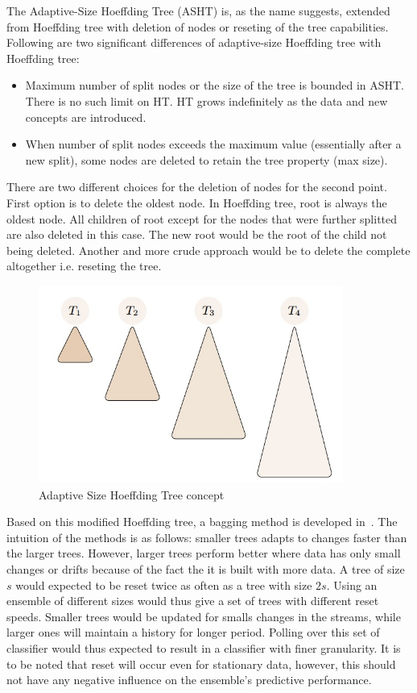 \documentclass[a4paper, 11pt, oneside]{book}
\begin{document}
The Adaptive-Size Hoeffding Tree (ASHT) is, as the name suggests, extended from Hoeffding tree with deletion of nodes or reseting of the tree capabilities. Following are two significant differences of adaptive-size Hoeffding tree with Hoeffding tree: 
\begin{itemize}
    \item Maximum number of split nodes or the size of the tree is bounded in ASHT. There is no such limit on HT. HT grows indefinitely as the data and new concepts are introduced.
    \item When number of split nodes exceeds the maximum value (essentially after a new split), some nodes are deleted to retain the tree property (max size).
\end{itemize}
There are two different choices for the deletion of nodes for the second point. First option is to delete the oldest node. In Hoeffding tree, root is always the oldest node. All children of root except for the nodes that were further splitted are also deleted in this case. The new root would be the root of the child not being deleted. Another and more crude approach would be to delete the complete altogether i.e. reseting the tree. 

\begin{figure}[htbp]
    \begin{center}
        \includegraphics[width=10.0cm]{figs/asht.jpg}
        \caption{Adaptive Size Hoeffding Tree concept}
        \label{fig:bg:asht}
    \end{center}
\end{figure}

Based on this modified Hoeffding tree, a bagging method is developed in~\cite{bifet09:asht}. The intuition of the methods is as follows: smaller trees adapts to changes faster than the larger trees. However, larger trees perform better where data has only small changes or drifts because of the fact the it is built with more data. A tree of size $s$ would expected to be reset twice as often as a tree with size $2s$. Using an ensemble of different sizes would thus give a set of trees with different reset speeds. Smaller trees would be updated for smalls changes in the streams, while larger ones will maintain a history for longer period. Polling over this set of classifier would thus expected to result in a classifier with finer granularity. It is to be noted that reset will occur even for stationary data, however, this should not have any negative influence on the ensemble's predictive performance.
\end{document}
